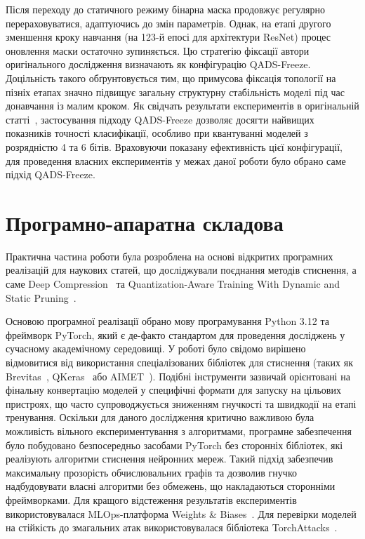 \documentclass{pma-mthesis}
\begin{document}
Після переходу до статичного режиму бінарна маска продовжує регулярно перераховуватися, адаптуючись до змін параметрів. Однак, на етапі другого зменшення кроку навчання (на 123-й епосі для архітектури ResNet) процес оновлення маски остаточно зупиняється. Цю стратегію фіксації автори оригінального дослідження визначають як конфігурацію QADS-Freeze. Доцільність такого  обґрунтовується тим, що примусова фіксація топології на пізніх етапах значно підвищує загальну структурну стабільність моделі під час донавчання із малим кроком. Як свідчать результати експериментів в оригінальній статті~\cite{10946020}, застосування підходу QADS-Freeze дозволяє досягти найвищих показників точності класифікації, особливо при квантуванні моделей з розрядністю 4 та 6 бітів. Враховуючи показану ефективність цієї конфігурації, для проведення власних експериментів у межах даної роботи було обрано саме підхід QADS-Freeze.

\section{Програмно-апаратна складова}

Практична частина роботи була розроблена на основі відкритих програмних реалізацій для наукових статей, що досліджували поєднання методів стиснення, а саме Deep Compression~\cite{Han2016DeepCompression,turner_deep_compression_2017} та Quantization-Aware Training With Dynamic and Static Pruning~\cite{10946020,ahnho_qat_pruning_2024}. 

Основою програмної реалізації обрано мову програмування Python 3.12 та фреймворк PyTorch, який є де-факто стандартом для проведення досліджень у сучасному академічному середовищі. У роботі було свідомо вирішено відмовитися від використання спеціалізованих бібліотек для стиснення (таких як Brevitas~\cite{brevitas}, QKeras~\cite{coelho2021ultra} або AIMET~\cite{siddegowda2022neural}). Подібні інструменти зазвичай орієнтовані на фінальну конвертацію моделей у специфічні формати для запуску на цільових пристроях, що часто супроводжується зниженням гнучкості та швидкодії на етапі тренування. Оскільки для даного дослідження критично важливою була можливість вільного експериментування з алгоритмами, програмне забезпечення було побудовано безпосередньо засобами PyTorch без сторонніх бібліотек, які реалізують алгоритми стиснення нейронних мереж. Такий підхід забезпечив максимальну прозорість обчислювальних графів та дозволив гнучко надбудовувати власні алгоритми без обмежень, що накладаються сторонніми фреймворками. Для кращого відстеження результатів експериментів використовувалася MLOps-платформа Weights \& Biases~\cite{wandb}. Для перевірки моделей на стійкість до змагальних атак використовувалася бібліотека TorchAttacks~\cite{kim2021torchattacks}.
\end{document}
